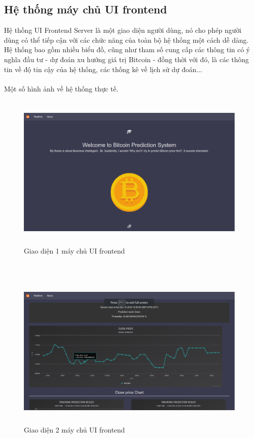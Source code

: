 \subsection{Hệ thống máy chủ UI frontend}
Hệ thồng UI Frontend Server là một giao diện người dùng, nó cho phép người 
dùng có thể tiếp cận với các chức năng của toàn bộ hệ thống một cách dễ dàng. 
Hệ thống bao gồm nhiều biểu đồ, cũng như tham số cung cấp các thông tin có ý 
nghĩa đầu tư - dự đoán xu hướng giá trị Bitcoin - đồng thời với đó, là các 
thông tin về độ tin cậy của hệ thống, các thống kê về lịch sử dự đoán...\\\\
Một số hình ảnh về hệ thống thực tế.\\
\begin{figure}[h!]
\centering
\includegraphics[height=3in, keepaspectratio=true]{1.png}
\caption{Giao diện 1 máy chủ UI frontend}
\end{figure}\\
\begin{figure}[h!]
\centering
\includegraphics[height=3in, keepaspectratio=true]{2.png}
\caption{Giao diện 2 máy chủ UI frontend}
\end{figure}\\\\
